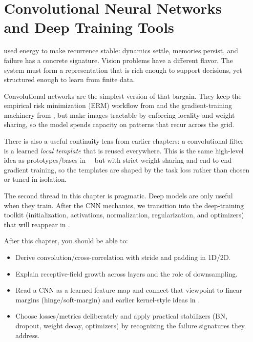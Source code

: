\section{Convolutional Neural Networks and Deep Training Tools}\label{chap:cnn}
\graphicspath{{assets/lec6/}{assets/lec8/}}

 used energy to make recurrence stable: dynamics settle, memories persist, and failure has a concrete signature. Vision problems have a different flavor. The system must form a representation that is rich enough to support decisions, yet structured enough to learn from finite data.

Convolutional networks are the simplest version of that bargain. They keep the empirical risk minimization (ERM) workflow from  and the gradient\hyp{}training machinery from , but make images tractable by enforcing locality and weight sharing, so the model spends capacity on patterns that recur across the grid.

There is also a useful continuity lens from earlier chapters: a convolutional filter is a learned \emph{local template} that is reused everywhere. This is the same high-level idea as prototypes/bases in ---but with strict weight sharing and end-to-end gradient training, so the templates are shaped by the task loss rather than chosen or tuned in isolation.


The second thread in this chapter is pragmatic. Deep models are only useful when they train. After the CNN mechanics, we transition into the deep\hyp{}training toolkit (initialization, activations, normalization, regularization, and optimizers) that will reappear in .

\begin{tcolorbox}[summarybox, title={Learning Outcomes}]
After this chapter, you should be able to:
\begin{itemize}
  \item Derive convolution/cross-correlation with stride and padding in 1D/2D.
  \item Explain receptive-field growth across layers and the role of downsampling.
  \item Read a CNN as a learned feature map and connect that viewpoint to linear margins (hinge/soft-margin) and earlier kernel-style ideas in .
  \item Choose losses/metrics deliberately and apply practical stabilizers (BN, dropout, weight decay, optimizers) by recognizing the failure signatures they address.
\end{itemize}
\end{tcolorbox}

